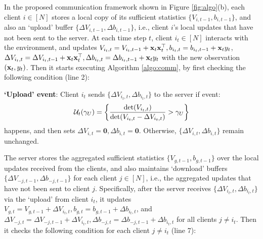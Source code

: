In the proposed communication framework shown in Figure \ref{fig:algo}(b), each client $i\in[N]$ stores a local copy of its sufficient statistics $\{V_{i,t-1},b_{i,t-1}\}$, and also an `upload' buffer $\{\Delta V_{i,t-1},\Delta b_{i,t-1}\}$, i.e., client $i$'s local updates that have not been sent to the server. At each time step $t$, client $i_{t}\in [N]$ interacts with the environment, and updates $V_{i_{t},t}=V_{i_{t},t-1}+\mathbf{x}_{t}\mathbf{x}_{t}^{\top},b_{i_{t},t}=b_{i_{t},t-1}+\mathbf{x}_{t}y_{t}$, $\Delta V_{i_{t},t}=\Delta V_{i_{t},t-1}+\mathbf{x}_{t}\mathbf{x}_{t}^{\top},\Delta b_{i_{t},t}=\Delta b_{i_{t},t-1}+\mathbf{x}_{t}y_{t}$ with the new observation $(\mathbf{x}_{t},y_{t})$. Then it starts executing 
Algorithm \ref{algo:comm}, by first checking the following condition (line 2):

\noindent \textbf{`Upload' event}: Client $i_{t}$ sends $\{\Delta V_{i_{t},t},\Delta b_{i_{t},t}\}$ to the server if event:
    \begin{equation}\label{eq:upload}
        \mathcal{U}_{t}(\gamma_{U}) = \left\{\frac{\det(V_{i_{t},t})}{\det(V_{i_{t},t}-\Delta V_{i_{t},t})} > \gamma_{U} \right\}
    \end{equation}
happens, and then sets $\Delta V_{i,t}=\textbf{0},\Delta b_{i,t}=\textbf{0}$. Otherwise, $\{\Delta V_{i,t}, \Delta b_{i,t}\}$ remain unchanged.

The server stores the aggregated sufficient statistics $\{V_{g,t-1},b_{g,t-1}\}$ over the local updates received from the clients, and also maintains `download' buffers $\{\Delta V_{-j,t-1},\Delta b_{-j,t-1}\}$ for each client $j\in [N]$, i.e., the aggregated updates that have not been sent to client $j$. Specifically, after the server receives $\{\Delta V_{i_{t},t},\Delta b_{i_{t},t}\}$ via the `upload' from client $i_t$, it updates $V_{g,t}=V_{g,t-1}+\Delta V_{i_{t},t},b_{g,t}=b_{g,t-1}+\Delta b_{i_{t},t}$, and $\Delta V_{-j,t}=\Delta V_{-j,t-1}+\Delta V_{i_{t},t},\Delta b_{-j,t}=\Delta b_{-j,t-1}+\Delta b_{i_{t},t}$ for all clients $j \neq i_{t}$. Then it checks the following condition for each client $j \neq i_{t}$ (line 7):

